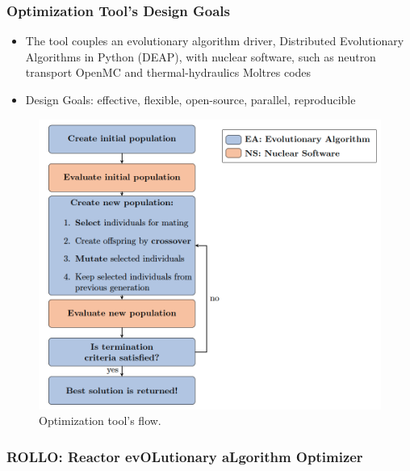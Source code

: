 \begin{frame}
    \frametitle{Optimization Tool's Design Goals}
    \begin{minipage}[c]{0.45\textwidth}
    \begin{itemize}
        \item The tool couples an evolutionary algorithm driver, Distributed 
        Evolutionary Algorithms in Python (DEAP), with 
        nuclear software, such as neutron transport OpenMC and thermal-hydraulics 
        Moltres codes
        \item Design Goals: effective, flexible, open-source, parallel,
        reproducible
    \end{itemize}
    \end{minipage}\hfill
    \begin{minipage}[c]{0.52\textwidth}
        \centering
        \begin{figure}
            \includegraphics[width=\linewidth]{figures/rollo-flow.png} 
            \caption{Optimization tool's flow.}
        \end{figure}
    \end{minipage}
\end{frame}

\begin{frame}
    \frametitle{ROLLO: Reactor evOLutionary aLgorithm Optimizer}
\end{frame}